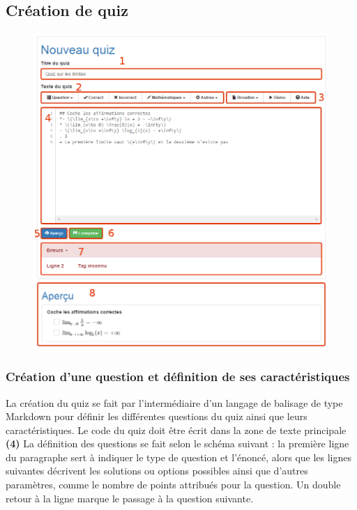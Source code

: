 \documentclass[a4,10pt,french]{sphinxmanual}
\begin{document}
\subsection{Création de quiz}
\label{doc-user:creation-de-quiz}\begin{figure}[htbp]
\centering

\includegraphics{create.png}
\end{figure}


\subsubsection{Création d'une question et définition de ses caractéristiques}
\label{doc-user:creation-d-une-question-et-definition-de-ses-caracteristiques}
La création du quiz se fait par l'intermédiaire d'un langage de balisage de type Markdown pour définir les différentes questions du quiz ainsi que leurs caractéristiques. Le code du quiz doit être écrit dans la zone de texte principale \textbf{(4)} La définition des questions se fait selon le schéma suivant : la première ligne du paragraphe sert à indiquer le type de question et l'énoncé, alors que les lignes suivantes décrivent les solutions ou options possibles ainsi que d'autres paramètres, comme le nombre de points attribués pour la question. Un double retour à la ligne marque le passage à la question suivante.
\end{document}
